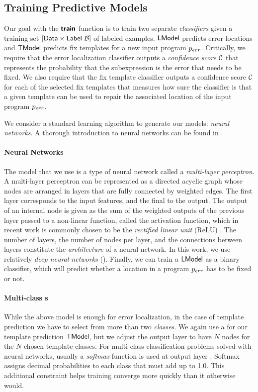 \subsection{Training Predictive Models}
\label{sec:templ-pred:train}
\lstDeleteShortInline{|} %

Our goal with the $\bm{\mathsf{train}}$ function is to train two separate
\emph{classifiers} given a training set $[\mathsf{Data} \times
\mathsf{Label}\ \mathcal{B}]$ of labeled examples. $\mathsf{LModel}$ predicts error locations and
$\mathsf{TModel}$ predicts fix templates for a new input program $p_{err}$. Critically, we
require that the error localization classifier outputs a \emph{confidence score}
$\mathcal{C}$ that represents the probability that the subexpression is the error that
needs to be fixed. We also require that the fix template classifier outputs a
confidence score $\mathcal{C}$ for each of the selected fix templates that measures
how sure the classifier is that a given template can be used to repair the
associated location of the input program $p_{err}$.

We consider a standard learning algorithm to generate our models: \emph{neural
networks}. A thorough introduction to neural networks can be found in
\citep{Hastie2009-bn,Nielsen2015-pu}.

\paragraph{Neural Networks}
The model that we use is a type of neural network called a \emph{multi-layer
perceptron}. A multi-layer perceptron can be represented as a directed acyclic
graph whose nodes are arranged in layers that are fully connected by weighted
edges. The first layer corresponds to the input features, and the final to the
output. The output of an internal node is given as the sum of the weighted
outputs of the previous layer passed to a non-linear function, called the
activation function, which in recent work is commonly chosen to be the
\emph{rectified linear unit} (ReLU) \citep{Nair2010-xg}. The number of layers,
the number of nodes per layer, and the connections between layers constitute the
\emph{architecture} of a neural network. In this work, we use relatively
\emph{deep neural networks} (\dnn). Finally, we can train a \dnn $\mathsf{LModel}$ as a
binary classifier, which will predict whether a location in a program $p_{err}$
has to be fixed or not.

\paragraph{Multi-class \dnn{}s}
While the above model is enough for error localization, in the case of template
prediction we have to select from more than two \emph{classes}. We again use a
\dnn for our template prediction $\mathsf{TModel}$, but we adjust the output layer to
have $N$ nodes for the $N$ chosen template-classes. For multi-class
classification problems solved with neural networks, usually a \emph{softmax}
function is used at output layer \citep{Goodfellow-et-al-2016,Bishop-book-2006}.
Softmax assigns decimal probabilities to each class that must add up to 1.0.
This additional constraint helps training converge more quickly than it
otherwise would.

